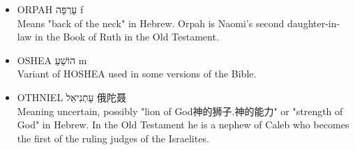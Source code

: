 \begin{itemize}
Means "fawn" in Hebrew. In the Old Testament this is the name of both a man mentioned in genealogies and a city in Manasseh.
\item ORPAH עָרְפָּה f \\
Means "back of the neck" in Hebrew. Orpah is Naomi's second daughter-in-law in the Book of Ruth in the Old Testament.
\item OSHEA הוֹשֵׁעַ m \\
Variant of HOSHEA used in some versions of the Bible.
\item OTHNIEL עָתְנִיאֵל 俄陀聂 \\
Meaning uncertain, possibly "lion of God神的狮子.神的能力" or "strength of God" in Hebrew. In the Old Testament he is a nephew of Caleb who becomes the first of the ruling judges of the Israelites.
\end{itemize}

